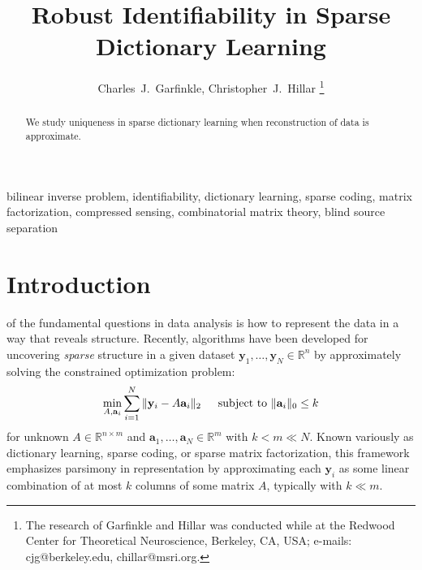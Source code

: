 \documentclass[journal, onecolumn]{IEEEtran}
\begin{document}
\title{Robust Identifiability in Sparse Dictionary Learning}

\author{Charles~J.~Garfinkle,  Christopher~J.~Hillar%
\thanks{The research of Garfinkle and Hillar was conducted while at the Redwood Center for Theoretical Neuroscience, Berkeley, CA, USA; e-mails: cjg@berkeley.edu, chillar@msri.org.}}%

\maketitle

\begin{abstract}
We study uniqueness in sparse dictionary learning when reconstruction of data is approximate.
\end{abstract}

\begin{IEEEkeywords}
bilinear inverse problem, identifiability, dictionary learning, sparse coding, matrix factorization, compressed sensing, combinatorial matrix theory, blind source separation
\end{IEEEkeywords}


\section{Introduction}

 of the fundamental questions in data analysis is how to represent the data in a way that reveals structure. Recently, algorithms have been developed for uncovering \emph{sparse} structure in a given dataset $\mathbf{y}_1, \ldots, \mathbf{y}_N \in \mathbb{R}^n$ by approximately solving the constrained optimization problem:
\begin{align}\label{DictionaryLearning}
\min_{A, \mathbf{a}_i} \sum_{i=1}^N \|\mathbf{y}_i - A\mathbf{a}_i\|_2 \indent \text{subject to } \|\mathbf{a}_i\|_0 \leq k 
\end{align}
%
for unknown $A \in \mathbb{R}^{n \times m}$ and $\mathbf{a}_1, \ldots, \mathbf{a}_N \in \mathbb{R}^m$ with $k < m \ll N$. Known variously as dictionary learning, sparse coding, or sparse matrix factorization, this framework emphasizes parsimony in representation by approximating each $\mathbf{y}_i$ as some linear combination of at most $k$ columns of some matrix $A$, typically with $k \ll m$. 
\end{document}
